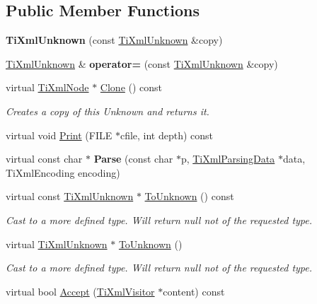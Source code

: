 \subsection*{Public Member Functions}
\begin{DoxyCompactItemize}
\item 
\hypertarget{class_ti_xml_unknown_abe798ff4feea31474850c7f0de6bdf5e}{}\label{class_ti_xml_unknown_abe798ff4feea31474850c7f0de6bdf5e} 
{\bfseries Ti\+Xml\+Unknown} (const \hyperlink{class_ti_xml_unknown}{Ti\+Xml\+Unknown} \&copy)
\item 
\hypertarget{class_ti_xml_unknown_a60560b5aacb4bdc8b2b5f02f0a99c5c0}{}\label{class_ti_xml_unknown_a60560b5aacb4bdc8b2b5f02f0a99c5c0} 
\hyperlink{class_ti_xml_unknown}{Ti\+Xml\+Unknown} \& {\bfseries operator=} (const \hyperlink{class_ti_xml_unknown}{Ti\+Xml\+Unknown} \&copy)
\item 
\hypertarget{class_ti_xml_unknown_a3dea7689de5b1931fd6657992948fde0}{}\label{class_ti_xml_unknown_a3dea7689de5b1931fd6657992948fde0} 
virtual \hyperlink{class_ti_xml_node}{Ti\+Xml\+Node} $\ast$ \hyperlink{class_ti_xml_unknown_a3dea7689de5b1931fd6657992948fde0}{Clone} () const
\begin{DoxyCompactList}\small\item\em Creates a copy of this Unknown and returns it. \end{DoxyCompactList}\item 
virtual void \hyperlink{class_ti_xml_unknown_a5793fbc48ab3419783c0e866ca2d334e}{Print} (F\+I\+LE $\ast$cfile, int depth) const
\item 
\hypertarget{class_ti_xml_unknown_aa51c2694e4177b5f0b5429ee5a81b58d}{}\label{class_ti_xml_unknown_aa51c2694e4177b5f0b5429ee5a81b58d} 
virtual const char $\ast$ {\bfseries Parse} (const char $\ast$p, \hyperlink{class_ti_xml_parsing_data}{Ti\+Xml\+Parsing\+Data} $\ast$data, Ti\+Xml\+Encoding encoding)
\item 
\hypertarget{class_ti_xml_unknown_a0d08dc16fc9ce16140ccaefbc35f6ea6}{}\label{class_ti_xml_unknown_a0d08dc16fc9ce16140ccaefbc35f6ea6} 
virtual const \hyperlink{class_ti_xml_unknown}{Ti\+Xml\+Unknown} $\ast$ \hyperlink{class_ti_xml_unknown_a0d08dc16fc9ce16140ccaefbc35f6ea6}{To\+Unknown} () const
\begin{DoxyCompactList}\small\item\em Cast to a more defined type. Will return null not of the requested type. \end{DoxyCompactList}\item 
\hypertarget{class_ti_xml_unknown_a67c9fd22940e8c47f706a72cdd2e332c}{}\label{class_ti_xml_unknown_a67c9fd22940e8c47f706a72cdd2e332c} 
virtual \hyperlink{class_ti_xml_unknown}{Ti\+Xml\+Unknown} $\ast$ \hyperlink{class_ti_xml_unknown_a67c9fd22940e8c47f706a72cdd2e332c}{To\+Unknown} ()
\begin{DoxyCompactList}\small\item\em Cast to a more defined type. Will return null not of the requested type. \end{DoxyCompactList}\item 
virtual bool \hyperlink{class_ti_xml_unknown_aafdf1b2d4f561979c7907bad91004999}{Accept} (\hyperlink{class_ti_xml_visitor}{Ti\+Xml\+Visitor} $\ast$content) const
\end{DoxyCompactItemize}
